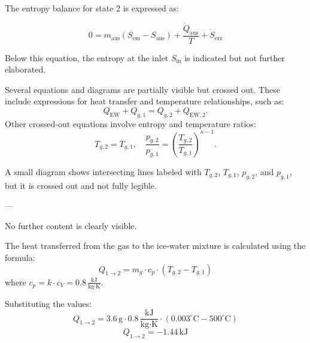 The entropy balance for state 2 is expressed as:  

\[
0 = m_{\text{aus}} \left( S_{\text{em}} - S_{\text{aus}} \right) + \frac{\dot{Q}_{\text{aus}}}{T} + \dot{S}_{\text{erz}}
\]

Below this equation, the entropy at the inlet \( S_{\text{in}} \) is indicated but not further elaborated.

Several equations and diagrams are partially visible but crossed out. These include expressions for heat transfer and temperature relationships, such as:  
\[
Q_{\text{EW}} + Q_{g,1} = Q_{g,2} + Q_{\text{EW},2}.
\]  
Other crossed-out equations involve entropy and temperature ratios:  
\[
T_{g,2} = T_{g,1}, \quad \frac{p_{g,2}}{p_{g,1}} = \left(\frac{T_{g,2}}{T_{g,1}}\right)^{\kappa - 1}.
\]  

A small diagram shows intersecting lines labeled with \( T_{g,2} \), \( T_{g,1} \), \( p_{g,2} \), and \( p_{g,1} \), but it is crossed out and not fully legible.  

---

No further content is clearly visible.

The heat transferred from the gas to the ice-water mixture is calculated using the formula:  
\[
Q_{1 \to 2} = m_g \cdot c_p \cdot (T_{g,2} - T_{g,1})
\]  
where \( c_p = k \cdot c_V = 0.8 \, \frac{\text{kJ}}{\text{kg} \cdot \text{K}} \).  

Substituting the values:  
\[
Q_{1 \to 2} = 3.6 \, \text{g} \cdot 0.8 \, \frac{\text{kJ}}{\text{kg} \cdot \text{K}} \cdot (0.003^\circ\text{C} - 500^\circ\text{C})
\]  
\[
Q_{1 \to 2} = -1.44 \, \text{kJ}
\]
